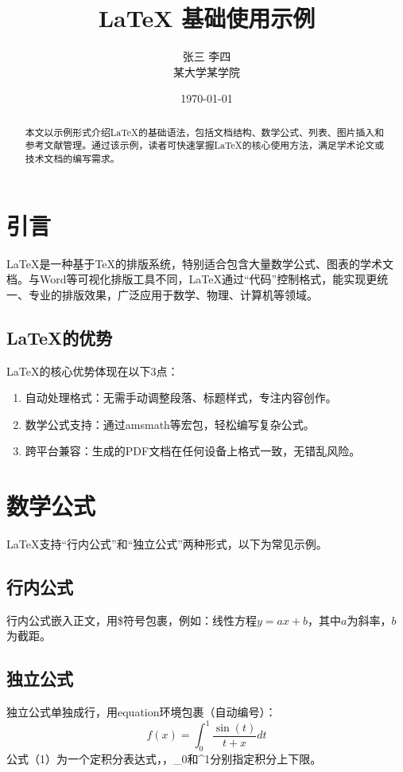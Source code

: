\documentclass[12pt,a4paper]{article}
\title{LaTeX 基础使用示例}
\author{张三 \quad 李四 \\ 某大学某学院}  %
\date{\today}  %
\begin{document}
\maketitle

\begin{abstract}
本文以示例形式介绍LaTeX的基础语法，包括文档结构、数学公式、列表、图片插入和参考文献管理。通过该示例，读者可快速掌握LaTeX的核心使用方法，满足学术论文或技术文档的编写需求。
\end{abstract}

\tableofcontents
\clearpage  %

\section{引言}
LaTeX是一种基于TeX的排版系统，特别适合包含大量数学公式、图表的学术文档。与Word等可视化排版工具不同，LaTeX通过“代码”控制格式，能实现更统一、专业的排版效果，广泛应用于数学、物理、计算机等领域。

\subsection{LaTeX的优势}
LaTeX的核心优势体现在以下3点：
\begin{enumerate}[1.]  %
    \item 自动处理格式：无需手动调整段落、标题样式，专注内容创作。
    \item 数学公式支持：通过amsmath等宏包，轻松编写复杂公式。
    \item 跨平台兼容：生成的PDF文档在任何设备上格式一致，无错乱风险。
\end{enumerate}

\section{数学公式}
LaTeX支持“行内公式”和“独立公式”两种形式，以下为常见示例。

\subsection{行内公式}
行内公式嵌入正文，用\$符号包裹，例如：线性方程\( y = ax + b \)，其中\( a \)为斜率，\( b \)为截距。

\subsection{独立公式}
独立公式单独成行，用equation环境包裹（自动编号）：
\begin{equation}  %
    f(x) = \int_{0}^{1} \frac{\sin(t)}{t + x} dt
\end{equation}
公式（1）为一个定积分表达式，，_{0}和^{1}分别指定积分上下限。
\end{document}
